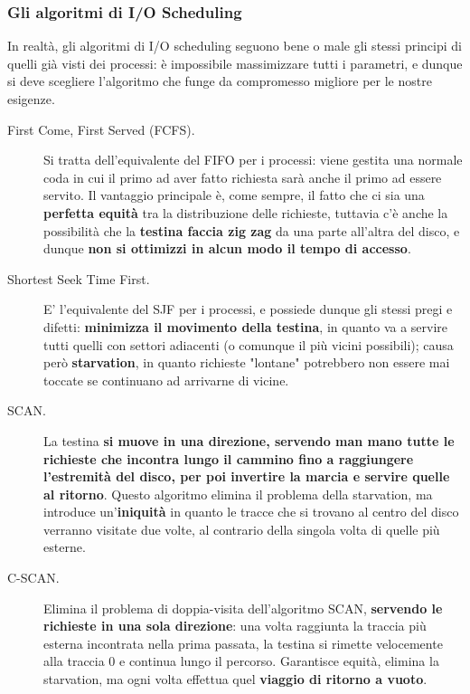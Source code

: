 \documentclass[12pt]{report}
\begin{document}
	\subsubsection*{Gli algoritmi di I/O Scheduling}
	In realtà, gli algoritmi di I/O scheduling seguono bene o male gli stessi principi di quelli già visti dei processi: è impossibile massimizzare tutti i parametri, e dunque si deve scegliere l'algoritmo che funge da compromesso migliore per le nostre esigenze.
	\begin{description}
		\item [First Come, First Served (FCFS).] Si tratta dell'equivalente del FIFO per i processi: viene gestita una normale coda in cui il primo ad aver fatto richiesta sarà anche il primo ad essere servito. Il vantaggio principale è, come sempre, il fatto che ci sia una \textbf{perfetta equità} tra la distribuzione delle richieste, tuttavia c'è anche la possibilità che la \textbf{testina faccia zig zag} da una parte all'altra del disco, e dunque \textbf{non si ottimizzi in alcun modo il tempo di accesso}.
		
		\item[Shortest Seek Time First.] E' l'equivalente del SJF per i processi, e possiede dunque gli stessi pregi e difetti: \textbf{minimizza il movimento della testina}, in quanto va a servire tutti quelli con settori adiacenti (o comunque il più vicini possibili); causa però \textbf{starvation}, in quanto richieste "lontane" potrebbero non essere mai toccate se continuano ad arrivarne di vicine.
		
		\item[SCAN.] La testina \textbf{si muove in una direzione, servendo man mano tutte le richieste che incontra lungo il cammino fino a raggiungere l'estremità del disco, per poi invertire la marcia e servire quelle al ritorno}. Questo algoritmo elimina il problema della starvation, ma introduce un'\textbf{iniquità} in quanto le tracce che si trovano al centro del disco verranno visitate due volte, al contrario della singola volta di quelle più esterne.
		
		\item[C-SCAN.] Elimina il problema di doppia-visita dell'algoritmo SCAN, \textbf{servendo le richieste in una sola direzione}: una volta raggiunta la traccia più esterna incontrata nella prima passata, la testina si rimette velocemente alla traccia 0 e continua lungo il percorso. Garantisce equità, elimina la starvation, ma ogni volta effettua quel \textbf{viaggio di ritorno a vuoto}.
		

\end{description}
\end{document}
